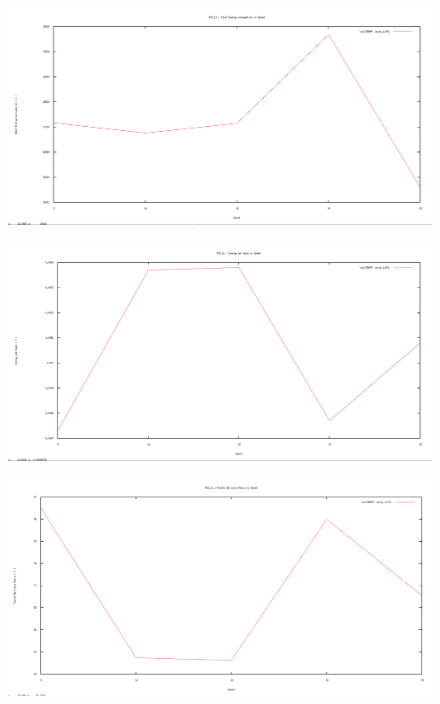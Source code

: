 \documentclass[12pt]{article}
\begin{document}
\begin{figure}[H]
	\centering
	\includegraphics[scale=	0.26]{image/802.11/Energyconsumption_vs_speed.png}
\end{figure}

\begin{figure}[H]
	\centering
	\includegraphics[scale=	0.26]{image/802.11/Energyperbytes_vs_speed.png}
\end{figure}

\begin{figure}[H]
	\centering
	\includegraphics[scale=	0.26]{image/802.11/Packetdeliveryratio_vs_speed.png}
\end{figure}
\end{document}
